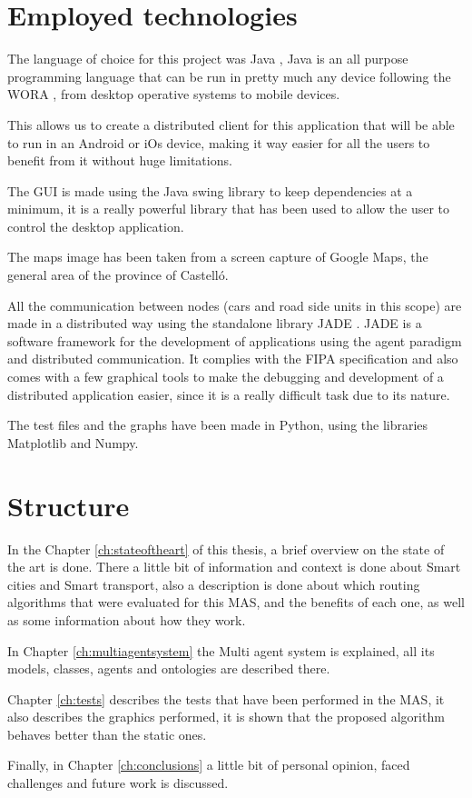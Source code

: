 \section{Employed technologies}

The language of choice for this project was Java \cite{java}, Java is an all purpose programming language that can be run in pretty much any device following the WORA \cite{wikipedia_wora}, from desktop operative systems to mobile devices.

This allows us to create a distributed client for this application that will be able to run in an Android or iOs device, making it way easier for all the users to benefit from it without huge limitations.

The GUI is made using the Java swing library \cite{swing} to keep dependencies at a minimum, it is a really powerful library that has been used to allow the user to control the desktop application.

The maps image has been taken from a screen capture of Google Maps, the general area of the province of Castell\'{o}.

All the communication between nodes (cars and road side units in this scope) are made in a distributed way using the standalone library JADE \cite{jade}. JADE is a software framework for the development of applications using the agent paradigm and distributed communication. It complies with the FIPA specification \cite{fipa} and also comes with a few graphical tools to make the debugging and development of a distributed application easier, since it is a really difficult task due to its nature.

The test files and the graphs have been made in Python, using the libraries Matplotlib and Numpy.

\section{Structure}

In the Chapter \ref{ch:stateoftheart} of this thesis, a brief overview on the state of the art is done. There a little bit of information and context is done about Smart cities and Smart transport, also a description is done about which routing algorithms that were evaluated for this MAS, and the benefits of each one, as well as some information about how they work. 

In Chapter \ref{ch:multiagentsystem} the Multi agent system is explained, all its models, classes, agents and ontologies are described there.

Chapter \ref{ch:tests} describes the tests that have been performed in the MAS, it also describes the graphics performed, it is shown that the proposed algorithm behaves better than the static ones.

Finally, in Chapter \ref{ch:conclusions} a little bit of personal opinion, faced challenges and future work is discussed.

